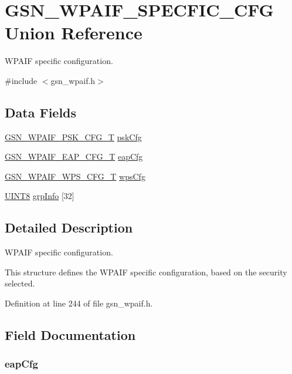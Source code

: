 \hypertarget{a00426}{
\section{GSN\_\-WPAIF\_\-SPECFIC\_\-CFG Union Reference}
\label{a00426}
}


WPAIF specific configuration.  




{\ttfamily \#include $<$gsn\_\-wpaif.h$>$}

\subsection*{Data Fields}
\begin{DoxyCompactItemize}
\item 
\hyperlink{a00425}{GSN\_\-WPAIF\_\-PSK\_\-CFG\_\-T} \hyperlink{a00426_a2619be40198046ea242a25a18cada2cf}{pskCfg}
\item 
\hyperlink{a00423}{GSN\_\-WPAIF\_\-EAP\_\-CFG\_\-T} \hyperlink{a00426_a9dabe435ea2d16848afb44eeabc64fd4}{eapCfg}
\item 
\hyperlink{a00427}{GSN\_\-WPAIF\_\-WPS\_\-CFG\_\-T} \hyperlink{a00426_ad38f00ce920632f4613cb9ab4b7abd9a}{wpsCfg}
\item 
\hyperlink{a00660_gab27e9918b538ce9d8ca692479b375b6a}{UINT8} \hyperlink{a00426_a150318da5e0341a089e4fc824a775394}{grpInfo} \mbox{[}32\mbox{]}
\end{DoxyCompactItemize}


\subsection{Detailed Description}
WPAIF specific configuration. 

This structure defines the WPAIF specific configuration, based on the security selected. 

Definition at line 244 of file gsn\_\-wpaif.h.



\subsection{Field Documentation}
\hypertarget{a00426_a9dabe435ea2d16848afb44eeabc64fd4}{
\subsubsection[{eapCfg}]{ {\bf eapCfg}}}
\label{a00426_a9dabe435ea2d16848afb44eeabc64fd4}



